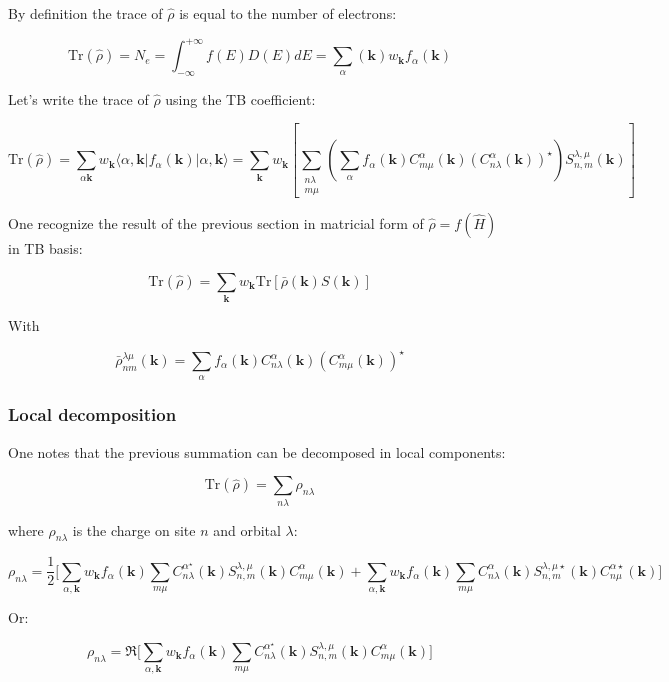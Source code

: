 \documentclass{article}
\newcommand{\bra}[1]{\langle #1|}
\newcommand{\ket}[1]{|#1\rangle}
\newcommand{\op}[1]{\hat{#1}}
\begin{document}
\noindent
By definition the trace of $\op{\rho}$ is equal to the number of electrons:

\[ \mbox{Tr}(\op{\rho})=N_e= \int_{-\infty}^{+\infty} f(E) D(E)dE
=
\sum_{\alpha}(\mathbf{k}) w_{\mathbf{k}} f_{\alpha}(\mathbf{k}) \]

\noindent Let's write the trace of $\op{\rho}$ using the TB coefficient:

\[ \displaystyle \mbox{Tr}(\op{\rho})=
\sum_{\alpha \mathbf{k}} w_{\mathbf{k}} \bra{\alpha,\mathbf{k}} f_{\alpha}(\mathbf{k})\ket{\alpha,\mathbf{k}}
=\sum_{\mathbf{k}} w_{\mathbf{k}} \left[\sum_{\substack{n\lambda\\ m \mu}} 
\left( \sum_{\alpha} f_{\alpha}(\mathbf{k})
C_{m\mu}^{\alpha}(\mathbf{k}) (C_{n \lambda}^{\alpha}(\mathbf{k}))^{\star}\right)
 S_{n,m}^{\lambda,\mu}(\mathbf{k}) \right]
 \]

\noindent
One recognize the result of the previous section in
matricial form of $\op{\rho}=f(\op{ H})$ in TB basis:

\[ \text{Tr}(\op{\rho})=\sum_{\mathbf{k}}w_{\mathbf{k}} \text{Tr}\left[\bar{\rho}(\mathbf{k})S(\mathbf{k})\right] \]

\noindent
With

\[ \bar{\rho}_{n m}^{\lambda \mu}(\mathbf{k})=  \sum_{\alpha} f_{\alpha}(\mathbf{k})
C_{n \lambda}^{\alpha}(\mathbf{k})(C_{m \mu}^{\alpha}(\mathbf{k}))^{\star}    \]

\subsubsection{Local decomposition}

\noindent One notes that the previous summation can be decomposed in local components:

\[ \displaystyle \mbox{Tr}(\op{\rho})=\sum_{n \lambda} \rho_{n
\lambda} \]

\noindent
where $\rho_{n \lambda}$ is the charge on site $n$ and orbital $\lambda$:

\[\rho_{n \lambda}=\frac{1}{2}\Bigg[\sum_{\alpha,\mathbf{k}} w_{\mathbf{k}}
f_{\alpha}(\mathbf{k}) \sum_{m \mu} C_{n
\lambda}^{\alpha ^{\star}}(\mathbf{k})S_{n,m}^{\lambda,\mu}(\mathbf{k})C_{m \mu}^{\alpha}(\mathbf{k}) + \sum_{\alpha,\mathbf{k}}
w_{\mathbf{k}}f_{\alpha}(\mathbf{k}) \sum_{m
\mu} C_{n \lambda}^{\alpha}(\mathbf{k})S_{n,m}^{\lambda,\mu
\star}(\mathbf{k})C_{n \mu}^{\alpha \star}(\mathbf{k}) \Bigg]\]

\noindent Or:

\[\rho_{n \lambda}=\Re \Bigg[\sum_{\alpha,\mathbf{k}}
w_{\mathbf{k}} f_{\alpha}(\mathbf{k}) \sum_{m
\mu} C_{n \lambda}^{\alpha
^{\star}}(\mathbf{k})S_{n,m}^{\lambda,\mu}(\mathbf{k})C_{m
\mu}^{\alpha}(\mathbf{k})\Bigg]\]
\end{document}
